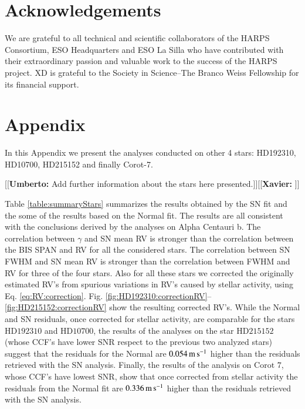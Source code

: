 \documentclass[11pt, oneside]{article}
\def\ms{\hbox{\,m\,s$^{-1}$}}         %
\newcommand{\xavier}[1]{{\color{blue}[[\textbf{Xavier: }#1]]}}
\newcommand{\umberto}[1]{{\color{green}[[\textbf{Umberto: }#1]]}}
\begin{document}
\section{Acknowledgements}

We are grateful to all technical and scientific collaborators of the HARPS Consortium, ESO Headquarters and ESO La Silla who have contributed with their extraordinary passion and valuable work to the success of the HARPS project.
XD is grateful to the Society in Science--The Branco Weiss Fellowship for its financial support.


\appendix
\section{Appendix} \label{appendix}

In this Appendix we present the analyses conducted on other 4 stars: HD192310, HD10700, HD215152 and finally Corot-7. 

\umberto{Add further information about the stars here presented.}\xavier{}

Table \ref{table:summaryStars} summarizes the results obtained by the SN fit and the some of the results based on the Normal fit. The results are all consistent with the conclusions derived by the analyses on Alpha Centauri b. The correlation between $\gamma$ and SN mean RV is stronger than the correlation between the BIS SPAN and RV for all the considered stars. The correlation between SN FWHM and SN mean RV is stronger than the correlation between FWHM and RV for three of the four stars.  Also for all these stars we corrected the originally estimated RV's from spurious variations in RV's caused by stellar activity, using Eq. \ref{eq:RV:correction}. Fig. \ref{fig:HD192310:correctionRV}--\ref{fig:HD215152:correctionRV} show the resulting corrected RV's. While the Normal and SN residuals, once corrected for stellar activity, are comparable for the stars $\text{HD}192310$ and $\text{HD}10700$, the results of the analyses on the star $\text{HD}215152$ (whose CCF's have lower SNR respect to the previous two analyzed stars) suggest that the residuals for the Normal are $0.054 \ms$ higher than the residuals retrieved with the SN analysis. Finally, the results of the analysis on $\text{Corot }7$, whose CCF's have lowest SNR, show that once corrected from stellar activity the residuals from the Normal fit are $0.336 \ms$ higher than the residuals retrieved with the SN analysis.
\end{document}

